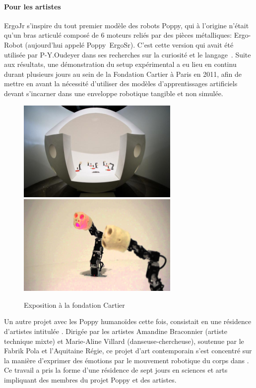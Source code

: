         \paragraph{Pour les artistes}
            ErgoJr s'inspire du tout premier modèle des robots Poppy, qui à l'origine n'était qu'un bras articulé composé de 6 moteurs reliés par des pièces métalliques: Ergo-Robot (aujourd'hui appelé Poppy~ErgoSr). C'est cette version qui avait été utilisée par P-Y.Oudeyer dans ses recherches sur la curiosité et le langage~. Suite aux résultats, une démonstration du setup expérimental a eu lieu en continu durant plusieurs jours au sein de la Fondation Cartier à Paris en 2011, afin de mettre en avant la nécessité d'utiliser des modèles d'apprentissages artificiels devant s'incarner dans une enveloppe robotique tangible et non simulée.
            \begin{figure}[!h]
                \centering
                \includegraphics[width=0.45\linewidth]{Figures/Oudeyer_expo-cartier}
                \includegraphics[width=0.45\linewidth]{Figures/Poppy_Ergo-lynch}
                \caption{Exposition à la fondation Cartier}
                \label{fig:expo_ergo}
            \end{figure}\par%
            Un autre projet avec les Poppy humanoïdes cette fois, consistait en une résidence d'artistes intitulée . Dirigée par les artistes Amandine Braconnier (artiste technique mixte) et Marie-Aline Villard (danseuse-chercheuse), soutenue par le Fabrik Pola et l'Aquitaine Régie, ce projet d'art contemporain s'est concentré sur la manière d'exprimer des émotions par le mouvement robotique du corps dans . Ce travail a pris la forme d'une résidence de sept jours en sciences et arts impliquant des membres du projet Poppy et des artistes. 

